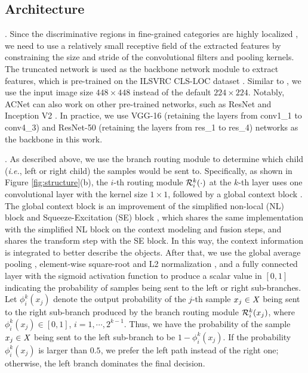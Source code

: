 \documentclass[10pt,twocolumn,letterpaper]{article}
\def\ie{{\em i.e.}}
\begin{document}
\subsection{Architecture}
{}. Since the discriminative regions in fine-grained categories are highly localized \cite{DBLP:conf/cvpr/WangMD18}, we need to use a relatively small receptive field of the extracted features by constraining the size and stride of the convolutional filters and pooling kernels. The truncated network is used as the backbone network module to extract features, which is pre-trained on the ILSVRC CLS-LOC dataset \cite{DBLP:journals/ijcv/RussakovskyDSKS15}. Similar to \cite{DBLP:conf/eccv/SunYZD18}, we use the input image size $448\times448$ instead of the default $224\times224$. Notably, ACNet can also work on other pre-trained networks, such as ResNet \cite{DBLP:conf/cvpr/HeZRS16} and Inception V2 \cite{DBLP:conf/icml/IoffeS15}. In practice, we use VGG-16 \cite{DBLP:journals/corr/SimonyanZ14a} (retaining the layers from conv1\_1 to conv4\_3) and ResNet-50 \cite{DBLP:conf/cvpr/HeZRS16} (retaining the layers from res\_1 to res\_4) networks as the backbone in this work. 

{}. As described above, we use the branch routing module to determine which child (\ie, left or right child) the samples would be sent to. Specifically, as shown in Figure \ref{fig:structure}(b), the $i$-th routing module ${\cal R}_{i}^{k}(\cdot)$ at the $k$-th layer uses one convolutional layer with the kernel size $1\times1$, followed by a global context block \cite{DBLP:journals/corr/abs-1904-11492}. The global context block is an improvement of the simplified non-local (NL) block \cite{DBLP:conf/cvpr/0004GGH18} and Squeeze-Excitation (SE) block \cite{DBLP:conf/cvpr/HuSS18}, which shares the same implementation with the simplified NL block on the context modeling and fusion steps, and shares the transform step with the SE block. In this way, the context information is integrated to better describe the objects. After that, we use the global average pooling \cite{DBLP:journals/corr/LinCY13}, element-wise square-root and L2 normalization \cite{DBLP:conf/bmvc/LinM17}, and a fully connected layer with the sigmoid activation function to produce a scalar value in $[0,1]$ indicating the probability of samples being sent to the left or right sub-branches. Let $\phi_{i}^{k}(x_j)$ denote the output probability of the $j$-th sample $x_j\in{\it X}$ being sent to the right sub-branch produced by the branch routing module ${\cal R}_{i}^{k}(x_j)$, where $\phi_i^{k}(x_j)\in[0, 1]$, $i=1,\cdots,2^{k-1}$. Thus, we have the probability of the sample $x_j\in{\it X}$ being sent to the left sub-branch to be $1-\phi_i^{k}(x_j)$. If the probability $\phi_{i}^{k}(x_j)$ is larger than $0.5$, we prefer the left path instead of the right one; otherwise, the left branch dominates the final decision. 
\end{document}
